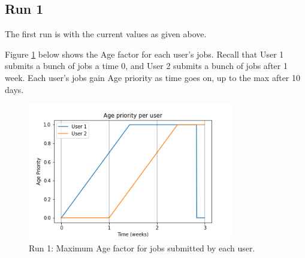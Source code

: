 \documentclass{article}
\begin{document}
\subsection{Run 1}
The first run is with the current values as given above.

Figure \ref{fig:one-age} below shows the Age factor for each user's
jobs.  Recall that User 1 submits a bunch of jobs a time 0, and User 2
submits a bunch of jobs after 1 week.  Each user's jobs gain Age
priority as time goes on, up to the max after 10 days.
\begin{figure}[h!]
  \begin{center}
    \includegraphics[width=0.8\textwidth]{sim-1-age}
  \end{center}
  \caption{Run 1: Maximum Age factor for jobs submitted by each user.
    \label{fig:one-age}}
\end{figure}

\newpage
\end{document}
